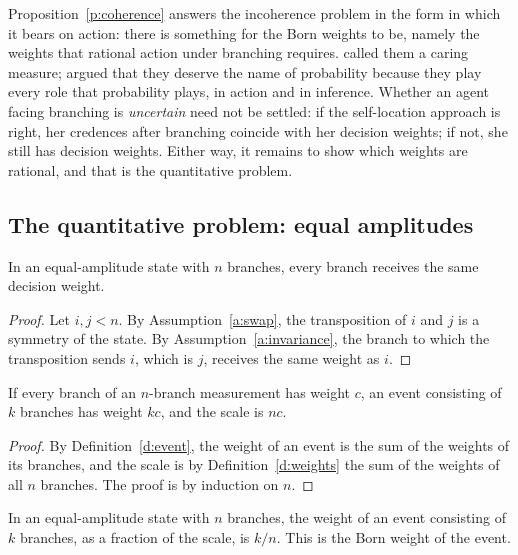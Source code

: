 \documentclass{situationist-preprint}
\begin{document}
Proposition~\ref{p:coherence} answers the incoherence problem in the form in which it bears on action: there is something for the Born weights to be, namely the weights that rational action under branching requires. \citet{Greaves2004} called them a caring measure; \citet{Wallace2012} argued that they deserve the name of probability because they play every role that probability plays, in action and in inference. Whether an agent facing branching is \emph{uncertain} need not be settled: if the self-location approach is right, her credences after branching coincide with her decision weights; if not, she still has decision weights. Either way, it remains to show which weights are rational, and that is the quantitative problem.

\subsection{The quantitative problem: equal amplitudes}

\begin{lemma}\label{l:equal}
In an equal-amplitude state with $n$ branches, every branch receives the same decision weight.
\end{lemma}

\begin{proof}
Let $i,j<n$. By Assumption~\ref{a:swap}, the transposition of $i$ and $j$ is a symmetry of the state. By Assumption~\ref{a:invariance}, the branch to which the transposition sends $i$, which is $j$, receives the same weight as $i$.
\end{proof}

\begin{lemma}[Counting]\label{l:count}
If every branch of an $n$-branch measurement has weight $c$, an event consisting of $k$ branches has weight $kc$, and the scale is $nc$.
\end{lemma}

\begin{proof}
By Definition~\ref{d:event}, the weight of an event is the sum of the weights of its branches, and the scale is by Definition~\ref{d:weights} the sum of the weights of all $n$ branches. The proof is by induction on $n$.
\end{proof}

\begin{theorem}\label{t:born}
In an equal-amplitude state with $n$ branches, the weight of an event consisting of $k$ branches, as a fraction of the scale, is $k/n$. This is the Born weight of the event.
\end{theorem}
\end{document}
